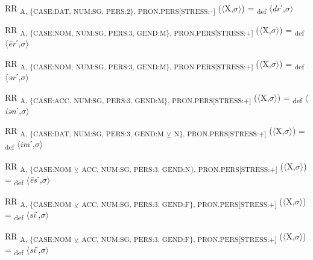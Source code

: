 {\begin{exe}
 RR \textsubscript{A, \{CASE:DAT, NUM:SG, PERS:2\}, PRON.PERS[STRESS:–]} ($\langle$X,$\sigma $$\rangle$) = \textsubscript{def} $\langle$\textit{dr}ˊ,$\sigma $$\rangle$
\end{exe}

\begin{exe}
 RR \textsubscript{A, \{CASE:NOM, NUM:SG, PERS:3, GEND:M\}, PRON.PERS[STRESS:+]} ($\langle$X,$\sigma $$\rangle$) = \textsubscript{def} $\langle$\textit{\=er}ˊ,$\sigma $$\rangle$
\end{exe}

\begin{exe}
 RR \textsubscript{A, \{CASE:NOM, NUM:SG, PERS:3, GEND:M\}, PRON.PERS[STRESS:+]} ($\langle$X,$\sigma $$\rangle$) = \textsubscript{def} $\langle$\textit{ər}ˊ,$\sigma $$\rangle$
\end{exe}

\begin{exe}
 RR \textsubscript{A, \{CASE:ACC, NUM:SG, PERS:3, GEND:M\}, PRON.PERS[STRESS:+]} ($\langle$X,$\sigma $$\rangle$) = \textsubscript{def} $\langle$\textit{iən}ˊ,$\sigma $$\rangle$
\end{exe}

\begin{exe}
 RR \textsubscript{A, \{CASE:DAT, NUM:SG, PERS:3, GEND:M} \textsubscript{${\veebar}$}\textsubscript{ N\}, PRON.PERS[STRESS:+]} ($\langle$X,$\sigma $$\rangle$) = \textsubscript{def} $\langle$\textit{im}ˊ,$\sigma $$\rangle$
\end{exe}

\begin{exe}
 RR \textsubscript{A, \{CASE:NOM} \textsubscript{${\veebar}$}\textsubscript{ ACC, NUM:SG, PERS:3, GEND:N\}, PRON.PERS[STRESS:+]} ($\langle$X,$\sigma $$\rangle$) = \textsubscript{def} $\langle$\textit{\=es}ˊ,$\sigma $$\rangle$
\end{exe}

\begin{exe}
 RR \textsubscript{A, \{CASE:NOM} \textsubscript{${\veebar}$}\textsubscript{ ACC, NUM:SG, PERS:3, GEND:F\}, PRON.PERS[STRESS:+]} ($\langle$X,$\sigma $$\rangle$) = \textsubscript{def} $\langle$\textit{s\=i}ˊ,$\sigma $$\rangle$
\end{exe}

\begin{exe}
 RR \textsubscript{A, \{CASE:NOM} \textsubscript{${\veebar}$}\textsubscript{ ACC, NUM:SG, PERS:3, GEND:F\}, PRON.PERS[STRESS:+]} ($\langle$X,$\sigma $$\rangle$) = \textsubscript{def} $\langle$\textit{si}ˊ,$\sigma $$\rangle$
\end{exe}

}
